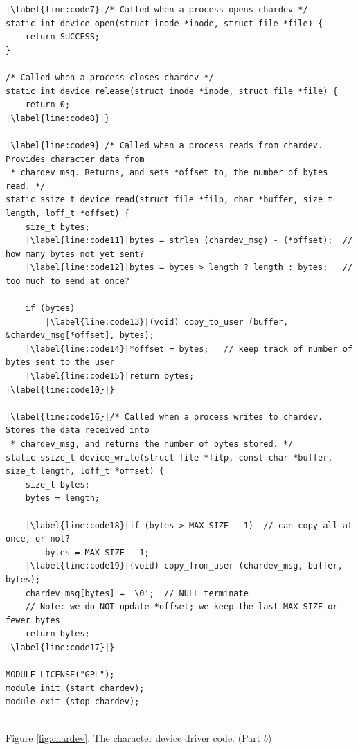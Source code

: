\documentclass[epsfig,10pt,fullpage]{article}
\begin{document}
\lstset{language=C,numbers=left,escapechar=|,firstnumber=auto,name=chardev}
\begin{center}
\begin{minipage}[t]{15 cm}
\begin{lstlisting}[name=chardev]
|\label{line:code7}|/* Called when a process opens chardev */
static int device_open(struct inode *inode, struct file *file) {
    return SUCCESS;
}

/* Called when a process closes chardev */
static int device_release(struct inode *inode, struct file *file) {
    return 0;
|\label{line:code8}|}

|\label{line:code9}|/* Called when a process reads from chardev. Provides character data from 
 * chardev_msg. Returns, and sets *offset to, the number of bytes read. */
static ssize_t device_read(struct file *filp, char *buffer, size_t length, loff_t *offset) {
    size_t bytes;
    |\label{line:code11}|bytes = strlen (chardev_msg) - (*offset);  // how many bytes not yet sent?
    |\label{line:code12}|bytes = bytes > length ? length : bytes;   // too much to send at once?
    
    if (bytes)
        |\label{line:code13}|(void) copy_to_user (buffer, &chardev_msg[*offset], bytes);
    |\label{line:code14}|*offset = bytes;	// keep track of number of bytes sent to the user
    |\label{line:code15}|return bytes;
|\label{line:code10}|}

|\label{line:code16}|/* Called when a process writes to chardev. Stores the data received into
 * chardev_msg, and returns the number of bytes stored. */
static ssize_t device_write(struct file *filp, const char *buffer, size_t length, loff_t *offset) {
    size_t bytes;
    bytes = length;

    |\label{line:code18}|if (bytes > MAX_SIZE - 1)	// can copy all at once, or not?
        bytes = MAX_SIZE - 1;
    |\label{line:code19}|(void) copy_from_user (chardev_msg, buffer, bytes);
    chardev_msg[bytes] = '\0';	// NULL terminate
    // Note: we do NOT update *offset; we keep the last MAX_SIZE or fewer bytes
    return bytes;
|\label{line:code17}|}

MODULE_LICENSE("GPL");
module_init (start_chardev);
module_exit (stop_chardev);
\end{lstlisting}
\end{minipage}
\end{center}
\begin{center}
~\\
Figure \ref{fig:chardev}. The character device driver code. (Part $b$)
\end{center}
\end{document}
